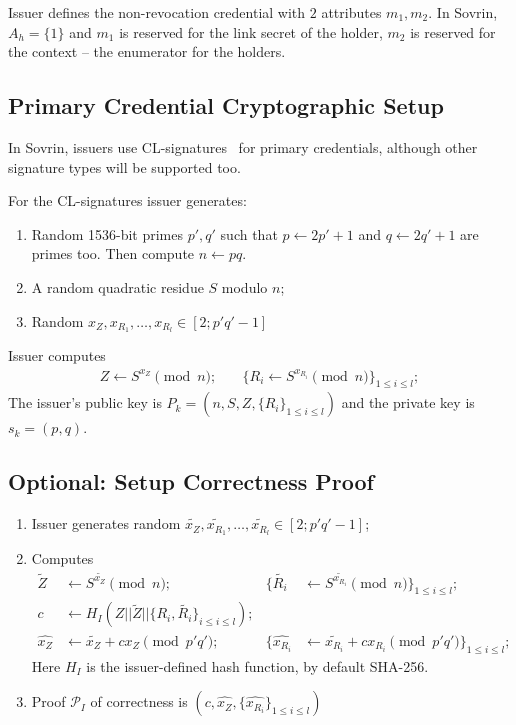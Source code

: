 \documentclass[a4paper]{article}
\begin{document}
Issuer defines the non-revocation credential  with $2$ attributes $m_1,m_2$. In Sovrin, $A_h = \{1\}$ and $m_1$ is reserved for the link secret of the holder, $m_2$ is reserved for the context -- the enumerator for the holders.


\subsection{Primary Credential Cryptographic Setup}\label{sec:setup-key1}
In Sovrin, issuers use CL-signatures~\cite{ACCUMULATORS} for primary credentials, although other signature types will be supported too.

For the CL-signatures issuer generates:
\begin{enumerate}
    \item Random 1536-bit primes $p',q'$ such that  $p \leftarrow 2p'+1$ and $q \leftarrow 2q'+1$ are primes too. Then compute $n \leftarrow pq$.
    \item A random quadratic residue  $S$ modulo $n$;
    \item Random $x_Z, x_{R_1},\ldots , x_{R_l}\in [2; p'q'-1]$
\end{enumerate}
Issuer computes
\begin{align}
    Z \leftarrow S^{x_Z}\pmod{n};&\quad \{R_i \leftarrow S^{x_{R_i}}\pmod{n}\}_{1\leq i \leq l};
\end{align}
The issuer's public key is $P_k = (n, S,Z,\{R_i\}_{1 \leq i\leq l})$ and the private key is $s_k = (p, q)$.\\
\subsection{Optional: Setup Correctness Proof}\label{sec:setup-proof}
\begin{enumerate}
\item Issuer generates random $\widetilde{x_Z}, \widetilde{x_{R_1}},\ldots,\widetilde{x_{R_l}}\in [2; p'q'-1]$;
\item Computes
\begin{align}
\widetilde{Z}& \leftarrow S^{\widetilde{x_Z}}\pmod{n};& \{\widetilde{R_i} &
\leftarrow S^{\widetilde{x_{R_i}}}\pmod{n}\}_{1\leq i \leq l};\\
c &\leftarrow H_I(Z||\widetilde{Z}||\{R_i,\widetilde{R_i}\}_{i\leq i \leq l});\\
\widehat{x_Z}& \leftarrow \widetilde{x_Z}+c x_Z \pmod{p'q'};&
\{\widehat{x_{R_i}}&\leftarrow \widetilde{x_{R_i}}+c x_{R_i}\pmod{p'q'}\}_{1\leq i \leq l};
\end{align}
Here $H_I$ is the issuer-defined hash function, by default SHA-256.

\item Proof $\mathcal{P}_I$ of correctness is $(c,\widehat{x_Z},\{\widehat{x_{R_i}}\}_{1 \leq i \leq l})$
\end{enumerate}
\end{document}
